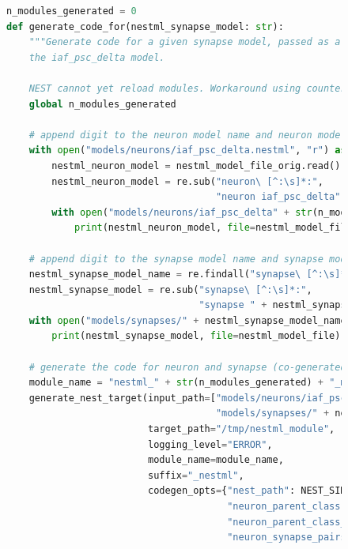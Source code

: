 \begin{figure}[ht!]
\begin{lstlisting}[language=Python, label=lst:generating_code, caption={The code-generation phase}]
n_modules_generated = 0
def generate_code_for(nestml_synapse_model: str):
    """Generate code for a given synapse model, passed as a string, in combination with
    the iaf_psc_delta model.

    NEST cannot yet reload modules. Workaround using counter to generate unique names."""
    global n_modules_generated

    # append digit to the neuron model name and neuron model filename
    with open("models/neurons/iaf_psc_delta.nestml", "r") as nestml_model_file_orig:
        nestml_neuron_model = nestml_model_file_orig.read()
        nestml_neuron_model = re.sub("neuron\ [^:\s]*:",
                                     "neuron iaf_psc_delta" + str(n_modules_generated) + ":", nestml_neuron_model)
        with open("models/neurons/iaf_psc_delta" + str(n_modules_generated) + ".nestml", "w") as nestml_model_file_mod:
            print(nestml_neuron_model, file=nestml_model_file_mod)

    # append digit to the synapse model name and synapse model filename
    nestml_synapse_model_name = re.findall("synapse\ [^:\s]*:", nestml_synapse_model)[0][8:-1]
    nestml_synapse_model = re.sub("synapse\ [^:\s]*:",
                                  "synapse " + nestml_synapse_model_name + str(n_modules_generated) + ":", nestml_synapse_model)
    with open("models/synapses/" + nestml_synapse_model_name + str(n_modules_generated) + ".nestml", "w") as nestml_model_file:
        print(nestml_synapse_model, file=nestml_model_file)

    # generate the code for neuron and synapse (co-generated)
    module_name = "nestml_" + str(n_modules_generated) + "_module"
    generate_nest_target(input_path=["models/neurons/iaf_psc_delta" + str(n_modules_generated) + ".nestml",
                                     "models/synapses/" + nestml_synapse_model_name + str(n_modules_generated) + ".nestml"],
                         target_path="/tmp/nestml_module",
                         logging_level="ERROR",
                         module_name=module_name,
                         suffix="_nestml",
                         codegen_opts={"nest_path": NEST_SIMULATOR_INSTALL_LOCATION,
                                       "neuron_parent_class": "StructuralPlasticityNode",
                                       "neuron_parent_class_include": "structural_plasticity_node.h",
                                       "neuron_synapse_pairs": [{"neuron": "iaf_psc_delta" + str(n_modules_generated),
                                                                   "synapse": nestml_synapse_model_name + str(n_modules_generated),
                                                                   "post_ports": ["post_spikes"]}]})


\end{lstlisting}
\end{figure}
